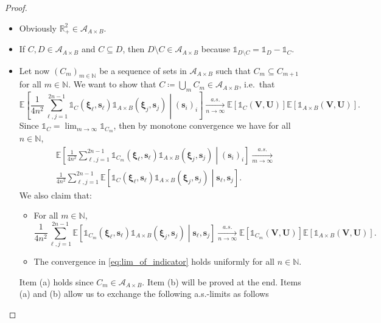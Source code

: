 \documentclass[11pt,a4paper,oneside]{article}
\theoremstyle{definition}
\theoremstyle{remark}
\def\N{\mathbb{N}}
\def\E{\mathbb{E}}
\def\R{\mathbb{R}}
\begin{document}
\begin{proof}
\begin{itemize}
\item Obviously $\R_+^2\in \mathcal{A}_{A\times B}$.
\item If $C,D\in\mathcal{A}_{A\times B}$ and $C\subseteq D$, then $D\setminus C\in \mathcal{A}_{A\times B}$ because $\mathds{1}_{D\setminus C}=\mathds{1}_{D}-\mathds{1}_{C}$. 
\item Let now $(C_m)_{m\in\N}$ be a sequence of sets in $\mathcal{A}_{A\times B}$ such that $C_m \subseteq C_{m+1}$ for all $m\in\N$. We want to show that $C\coloneqq\bigcup_m C_m\in \mathcal{A}_{A\times B}$, i.e.\ that 
\begin{equation}\label{eq:ifbueiwbfowebnfoewinf}
\E\left[\frac{1}{4n^2}\sum_{\ell,j=1}^{2n-1}\mathds{1}_{C}\left(\bm \xi_\ell,\bm s_\ell\right)\mathds{1}_{A\times B}\left(\bm \xi_j,\bm s_j\right)\middle| ( \bm s_i)_i\right]
\xrightarrow[n\to\infty]{a.s.} 
\E\left[\mathds{1}_{C}(\bm V,\bm U)\right]\E\left[\mathds{1}_{A \times B}(\bm V,\bm U)\right].
\end{equation}
Since $\mathds{1}_{C}=\lim_{m\to \infty}\mathds{1}_{C_m}$, then by monotone convergence we have for all $n\in \N$,
\begin{multline}\label{eq:lim_of_indicator}
\E\left[\frac{1}{4n^2}\sum_{\ell,j=1}^{2n-1}\mathds{1}_{C_m}\left(\bm \xi_\ell,\bm s_\ell\right)\mathds{1}_{A\times B}\left(\bm \xi_j,\bm s_j\right)\middle| ( \bm s_i)_i\right]
\xrightarrow[m\to\infty]{a.s.}\\
\frac{1}{4n^2}\sum_{\ell,j=1}^{2n-1}\E\left[\mathds{1}_{C}\left(\bm \xi_\ell,\bm s_\ell\right)\mathds{1}_{A\times B}\left(\bm \xi_j,\bm s_j\right)\middle|  \bm s_\ell,\bm s_j\right].
\end{multline}
We also claim that:
\begin{itemize}
	\item[(a)] For all $m\in\N$, 
	\begin{equation}
	\frac{1}{4n^2}\sum_{\ell,j=1}^{2n-1}\E\left[\mathds{1}_{C_m}\left(\bm \xi_\ell,\bm s_\ell\right)\mathds{1}_{A\times B}\left(\bm \xi_j,\bm s_j\right)\middle|  \bm s_\ell,\bm s_j\right]\xrightarrow[n\to\infty]{a.s.} \E\left[\mathds{1}_{C_m}(\bm V,\bm U)\right]\E\left[\mathds{1}_{A \times B}(\bm V,\bm U)\right].
	\end{equation}
	\item[(b)] The convergence in \cref{eq:lim_of_indicator} holds uniformly for all $n\in\N$.
\end{itemize}
Item (a) holds since $C_m \in \mathcal{A}_{A\times B}$.
Item (b) will be proved at the end. Items (a) and (b) allow us to exchange the following a.s.-limits as follows 

\end{itemize}
\end{proof}
\end{document}
